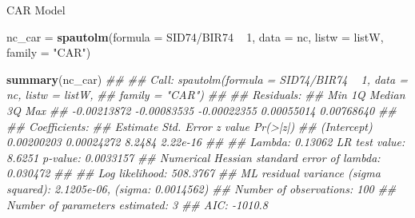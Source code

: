 \documentclass[11pt,ignorenonframetext,]{beamer}
\newenvironment{Shaded}{}{}
\newcommand{\CommentTok}[1]{\textcolor[rgb]{0.38,0.63,0.69}{\textit{#1}}}
\newcommand{\DataTypeTok}[1]{\textcolor[rgb]{0.56,0.13,0.00}{#1}}
\newcommand{\DecValTok}[1]{\textcolor[rgb]{0.25,0.63,0.44}{#1}}
\newcommand{\KeywordTok}[1]{\textcolor[rgb]{0.00,0.44,0.13}{\textbf{#1}}}
\newcommand{\NormalTok}[1]{#1}
\newcommand{\OperatorTok}[1]{\textcolor[rgb]{0.40,0.40,0.40}{#1}}
\newcommand{\StringTok}[1]{\textcolor[rgb]{0.25,0.44,0.63}{#1}}
\let\oldShaded\Shaded
\let\endoldShaded\endShaded
\renewenvironment{Shaded}{\footnotesize\begin{spacing}{0.9}\oldShaded}{\endoldShaded\end{spacing}}
\let\oldverbatim\verbatim
\let\endoldverbatim\endverbatim
\newcommand{\scriptoutput}{
  \renewenvironment{Shaded}{\scriptsize\begin{spacing}{0.9}\oldShaded}{\endoldShaded\end{spacing}}
  \renewenvironment{verbatim}{\scriptsize\begin{spacing}{0.9}\oldverbatim}{\endoldverbatim\end{spacing}}
}
\begin{document}
\begin{frame}[fragile,t]{CAR Model}
\protect\hypertarget{car-model}{}

\scriptoutput

\begin{Shaded}
\begin{Highlighting}[]
\NormalTok{nc_car =}\StringTok{ }\KeywordTok{spautolm}\NormalTok{(}\DataTypeTok{formula =}\NormalTok{ SID74}\OperatorTok{/}\NormalTok{BIR74 }\OperatorTok{~}\StringTok{ }\DecValTok{1}\NormalTok{, }\DataTypeTok{data =}\NormalTok{ nc, }
                  \DataTypeTok{listw =}\NormalTok{ listW, }\DataTypeTok{family =} \StringTok{"CAR"}\NormalTok{) }

\KeywordTok{summary}\NormalTok{(nc_car)}
\CommentTok{## }
\CommentTok{## Call: spautolm(formula = SID74/BIR74 ~ 1, data = nc, listw = listW, }
\CommentTok{##     family = "CAR")}
\CommentTok{## }
\CommentTok{## Residuals:}
\CommentTok{##         Min          1Q      Median          3Q         Max }
\CommentTok{## -0.00213872 -0.00083535 -0.00022355  0.00055014  0.00768640 }
\CommentTok{## }
\CommentTok{## Coefficients: }
\CommentTok{##               Estimate Std. Error z value Pr(>|z|)}
\CommentTok{## (Intercept) 0.00200203 0.00024272  8.2484 2.22e-16}
\CommentTok{## }
\CommentTok{## Lambda: 0.13062 LR test value: 8.6251 p-value: 0.0033157 }
\CommentTok{## Numerical Hessian standard error of lambda: 0.030472 }
\CommentTok{## }
\CommentTok{## Log likelihood: 508.3767 }
\CommentTok{## ML residual variance (sigma squared): 2.1205e-06, (sigma: 0.0014562)}
\CommentTok{## Number of observations: 100 }
\CommentTok{## Number of parameters estimated: 3 }
\CommentTok{## AIC: -1010.8}
\end{Highlighting}
\end{Shaded}

\end{frame}
\end{document}
